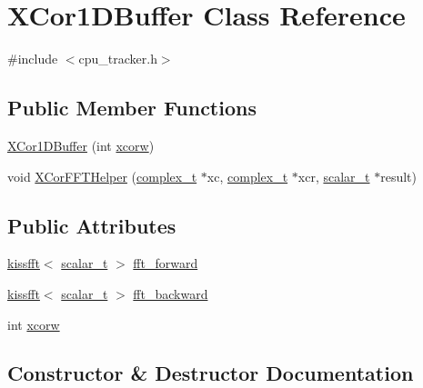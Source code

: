 \hypertarget{class_x_cor1_d_buffer}{}\section{X\+Cor1\+D\+Buffer Class Reference}
\label{class_x_cor1_d_buffer}


{\ttfamily \#include $<$cpu\+\_\+tracker.\+h$>$}

\subsection*{Public Member Functions}
\begin{DoxyCompactItemize}
\item 
\hyperlink{class_x_cor1_d_buffer_a9b53783159f4a512cc5c4713d436a76c}{X\+Cor1\+D\+Buffer} (int \hyperlink{class_x_cor1_d_buffer_a3a5d68c065a62d412b4d615647b30788}{xcorw})
\item 
void \hyperlink{class_x_cor1_d_buffer_a4c14e7a041865cb0405f460881d738b6}{X\+Cor\+F\+F\+T\+Helper} (\hyperlink{scalar__types_8h_abaffcd8bea58063cc6c608dda082ad05}{complex\+\_\+t} $\ast$xc, \hyperlink{scalar__types_8h_abaffcd8bea58063cc6c608dda082ad05}{complex\+\_\+t} $\ast$xcr, \hyperlink{scalar__types_8h_a03fcef84665498b9cfcf9c7cc25574e9}{scalar\+\_\+t} $\ast$result)
\end{DoxyCompactItemize}
\subsection*{Public Attributes}
\begin{DoxyCompactItemize}
\item 
\hyperlink{classkissfft}{kissfft}$<$ \hyperlink{scalar__types_8h_a03fcef84665498b9cfcf9c7cc25574e9}{scalar\+\_\+t} $>$ \hyperlink{class_x_cor1_d_buffer_ab7aa1608417f91f44fdc4acc963e6d3b}{fft\+\_\+forward}
\item 
\hyperlink{classkissfft}{kissfft}$<$ \hyperlink{scalar__types_8h_a03fcef84665498b9cfcf9c7cc25574e9}{scalar\+\_\+t} $>$ \hyperlink{class_x_cor1_d_buffer_afc27a4abe914d01397a98e174983916a}{fft\+\_\+backward}
\item 
int \hyperlink{class_x_cor1_d_buffer_a3a5d68c065a62d412b4d615647b30788}{xcorw}
\end{DoxyCompactItemize}


\subsection{Constructor \& Destructor Documentation}
